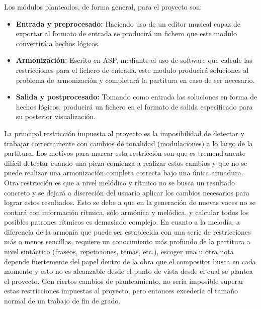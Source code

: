  Los módulos planteados, de forma general, para el proyecto son:
 \begin{itemize}
 	\item \textbf{Entrada y preprocesado:} Haciendo uso de un editor musical capaz de exportar al formato de entrada se producirá un fichero que este modulo convertirá a hechos lógicos.
 	\item \textbf{Armonización:} Escrito en ASP, mediante el uso de software que calcule las restricciones para el fichero de entrada, este modulo producirá soluciones al problema de armonización y completará la partitura en caso de ser necesario.
 	\item \textbf{Salida y postprocesado:} Tomando como entrada las soluciones en forma de hechos lógicos, producirá un fichero en el formato de salida especificado para su posterior visualización.
 \end{itemize}
 
 La principal restricción impuesta al proyecto es la imposibilidad de detectar y trabajar correctamente con cambios de tonalidad (modulaciones) a lo largo de la partitura. Los motivos para marcar esta restricción son que es tremendamente difícil detectar cuando una pieza comienza a realizar estos cambios y que no se puede realizar una armonización completa correcta bajo una única armadura. Otra restricción es que a nivel melódico y rítmico no se busca un resultado concreto y se dejará a discreción del usuario aplicar los cambios necesarios para lograr estos resultados. Esto se debe a que en la generación de nuevas voces no se contará con información rítmica, sólo armónica y melódica, y calcular todos los posibles patrones rítmicos es demasiado complejo. En cuanto a la melodía, a diferencia de la armonía que puede ser establecida con una serie de restricciones más o menos sencillas, requiere un conocimiento más profundo de la partitura a nivel sintáctico (fraseos, repeticiones, temas, etc.), escoger una u otra nota depende fuertemente del papel dentro de la obra que el compositor busca en cada momento y esto no es alcanzable desde el punto de vista desde el cual se plantea el proyecto. Con ciertos cambios de planteamiento, no sería imposible superar estas restricciones impuestas al proyecto, pero entonces excedería el tamaño normal de un trabajo de fin de grado.
 
 
